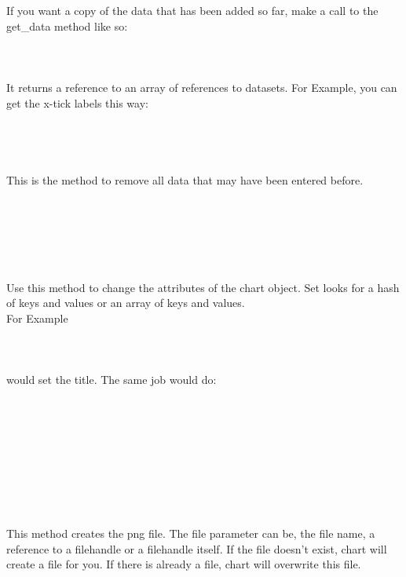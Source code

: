If you want a copy of the data that has been added so far, make a call to the get\_data method like so:\\
\\
\\
\\
It returns a reference to an array of references to datasets. For Example, you can get the x-tick labels this way:\\
\\
\\
\\ 
 \\
This is the method to remove all data that may have been entered before.\\
\\
\\
\\
\\
\\
\\
Use this method to change the attributes of the chart object. Set looks for a hash of keys and values or an array of keys and values.\\
For Example\\
\\
\\
\\
would set the title. The same job would do:\\
\\
\\ 
\\
\\
\\
 \\
 \\
 \\
\\
This method creates the png file. The file parameter can be, the file name, a reference to a filehandle or a filehandle itself. If the file doesn't exist, chart will create a file for you. If there is already a file, chart will overwrite this file.\\
